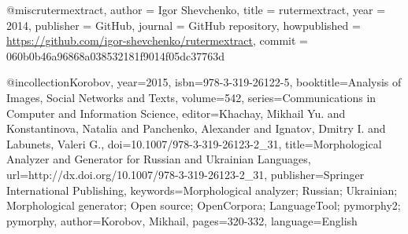@misc{rutermextract,
  author = {Igor Shevchenko},
  title = {rutermextract},
  year = {2014},
  publisher = {GitHub},
  journal = {GitHub repository},
  howpublished = {\url{https://github.com/igor-shevchenko/rutermextract}},
  commit = {060b0b46a96868a038532181f9014f05dc37763d}
}

@incollection{Korobov,
   year={2015},
   isbn={978-3-319-26122-5},
   booktitle={Analysis of Images, Social Networks and Texts},
   volume={542},
   series={Communications in Computer and Information Science},
   editor={Khachay, Mikhail Yu. and Konstantinova, Natalia and Panchenko, Alexander and Ignatov, Dmitry I. and Labunets, Valeri G.},
   doi={10.1007/978-3-319-26123-2_31},
   title={Morphological Analyzer and Generator for Russian and Ukrainian Languages},
   url={http://dx.doi.org/10.1007/978-3-319-26123-2_31},
   publisher={Springer International Publishing},
   keywords={Morphological analyzer; Russian; Ukrainian; Morphological generator; Open source; OpenCorpora; LanguageTool; pymorphy2; pymorphy},
   author={Korobov, Mikhail},
   pages={320-332},
   language={English}
}
